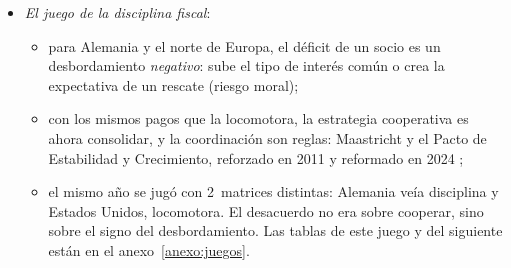 \documentclass[11pt]{article}
\begin{document}
\begin{itemize}
\item \emph{El juego de la disciplina fiscal}\nocite{Frankel2016Coordination}:
  \begin{itemize}
  \item para Alemania y el norte de Europa, el déficit de un socio es un desbordamiento \emph{negativo}: sube el tipo de interés común o crea la expectativa de un rescate (riesgo moral);
  \item con los mismos pagos que la locomotora, la estrategia cooperativa es ahora consolidar, y la coordinación son reglas: Maastricht y el Pacto de Estabilidad y Crecimiento, reforzado en 2011\nocite{UE2011Reglamento1175} y reformado en 2024\nocite{UE2024Reglamento1263} ;
  \item el mismo año se jugó con 2~matrices distintas: Alemania veía disciplina y Estados Unidos, locomotora. El desacuerdo no era sobre cooperar, sino sobre el signo del desbordamiento. Las tablas de este juego y del siguiente están en el anexo~\ref{anexo:juegos}.
  \end{itemize}
\end{itemize}

\end{document}

